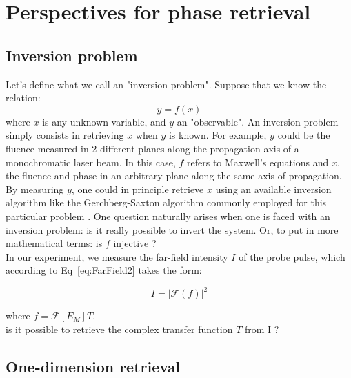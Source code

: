 \section{Perspectives for phase retrieval}\label{section:Phase retrieval perspective}

\subsection{Inversion problem}\label{subsection:Inversion problem}

Let's define what we call an "inversion problem". Suppose that we know the relation:
\begin{equation}
\label{eq:InversionEquation}
y = f(x)
\end{equation}
\noindent where $x$ is any unknown variable, and $y$ an "observable". An inversion problem simply consists in retrieving $x$ when $y$ is known.  For example, $y$ could be the fluence measured in 2 different planes along the propagation axis of a monochromatic laser beam. In this case, $f$ refers to Maxwell's equations and $x$, the fluence and phase in an arbitrary plane along the same axis of propagation. By measuring $y$, one could in principle retrieve $x$ using an available inversion algorithm like the Gerchberg-Saxton algorithm commonly employed for this particular problem \cite{hayes1983recursive,yang1994gerchberg}. One question naturally arises when one is faced with an inversion problem: is it really possible to invert the system. Or, to put in more mathematical terms: is $f$ injective ?\\

\noindent In our experiment, we measure the far-field intensity $I$ of the probe pulse, which according to Eq~\ref{eq:FarField2} takes the form:

\begin{equation}
\label{eq:InversionProblem} I= |\mathscr{F}( f )|^2
\end{equation}

\noindent where $f=\mathscr{F}[E_M] T$.\\

\noindent {} is it possible to retrieve the complex transfer function $T$ from I ?

\subsection{One-dimension retrieval}

